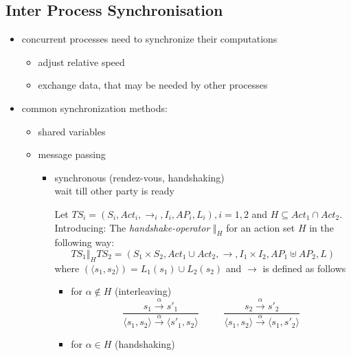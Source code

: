 \documentclass[a4paper, 10pt]{article}
\begin{document}
\subsection{Inter Process Synchronisation}
\begin{itemize}
    \item concurrent processes need to synchronize their computations
    \begin{itemize}
        \item adjust relative speed
        \item exchange data, that may be needed by other processes
    \end{itemize}
    \item common synchronization methods:
    \begin{itemize}
        \item shared variables
        \item message passing
        \begin{itemize}
            \item synchronous (rendez-vous, handshaking) \\
            wait till other party is ready
            \begin{shaded}
                Let $TS_i=(S_i,Act_i,\longrightarrow_i,I_i,AP_i,L_i), i=1,2$ and $H\subseteq Act_1\cap Act_2$. \\
                Introducing: The \emph{handshake-operator} $\Vert_H$ for an action set $H$ in the following way:
                \[ TS_1 \Vert_H TS_2 = (S_1\times S_2,Act_1\cup Act_2,\longrightarrow,I_1\times I_2, AP_1 \uplus AP_2,L) \]
                where $(\langle s_1,s_2\rangle) = L_1(s_1)\cup L_2(s_2)$ and $\longrightarrow$ is defined as follows
                \begin{itemize}
                    \item for $\alpha\not\in H$ (interleaving)
                    \[
                    \frac{
                    s_1 \overset{\alpha}{\longrightarrow} s'_1
                    }{
                    \langle s_1,s_2 \rangle \overset{\alpha}{\longrightarrow} \langle s'_1,s_2 \rangle
                    }
                    \phantom{\textrm{ and ·}}
                    \frac{
                    s_2 \overset{\alpha}{\longrightarrow} s'_2
                    }{
                    \langle s_1,s_2 \rangle \overset{\alpha}{\longrightarrow} \langle s_1,s'_2 \rangle
                    }
                    \]
                    \item for $\alpha\in H$ (handshaking)

\end{itemize}
\end{shaded}
\end{itemize}
\end{itemize}
\end{itemize}
\end{document}
